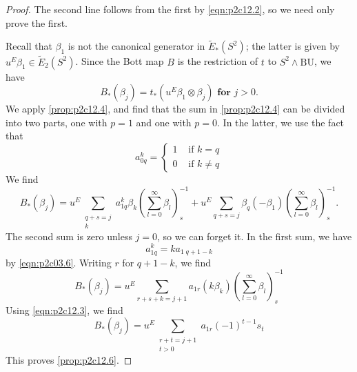 \documentclass[../main]{subfiles}
\begin{document}
\begin{proof}
The second line follows from the first by \eqref{eqn:p2c12.2}, so we need only prove the first. 

Recall that $\beta_1$ is not the canonical generator in $\widetilde{E}_\ast(S^2)$; the latter is given by $u^E\beta_1\in\widetilde{E}_2(S^2)$. Since the Bott map $B$ is the restriction of $t$ to $S^2\wedge\mathrm{BU}$, we have $$B_\ast(\beta_j) = t_\ast(u^E\beta_1\otimes\beta_j)\textbf{ for } j>0.$$ 
We apply \eqref{prop:p2c12.4}, and find that the sum in \eqref{prop:p2c12.4} can be divided into two parts, one with $p=1$ and one with $p=0$. In the latter, we use the fact that 
$$a^k_{0q} = \begin{cases}1 &\text{ if }k=q\\ 0&\text{ if } k\neq q\end{cases}$$
We find
\begin{equation*}
B_\ast(\beta_j) = u^E \sum_{\substack{q+s=j\\ k}} a^k_{1q} \beta_k \left(\sum^\infty_{l=0}\beta_l\right)^{-1}_s + u^E \sum_{q+s=j} \beta_{q}(-\beta_1)\left(\sum^\infty_{l=0} \beta_l\right)^{-1}_s.
\end{equation*}
The second sum is zero unless $j=0$, so we can forget it. In the first sum, we have 
$$a^k_{1q} = ka_{1\; q+1-k}$$
by \eqref{eqn:p2c03.6}. Writing $r$ for $q+1-k$, we find
$$B_\ast(\beta_j) = u^E \sum_{r+s+k=j+1} a_{1r} (k\beta_k)\left(\sum^\infty_{l=0} \beta_l\right)^{-1}_s$$
Using \eqref{eqn:p2c12.3}, we find
$$B_\ast(\beta_j) = u^E \sum_{\substack{r+t=j+1\\t>0}} a_{1r} (-1)^{t-1} s_t$$
This proves \eqref{prop:p2c12.6}.
\end{proof}
\end{document}
